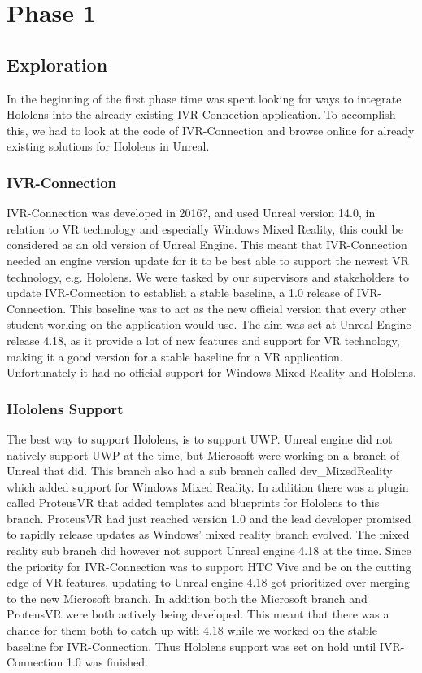 \chapter{Phase 1}
    \label{chapter:phase1}
    \section{Exploration}
    In the beginning of the first phase time was spent looking for ways to integrate Hololens into the already existing IVR-Connection application. To accomplish this, we had to look at the code of IVR-Connection and browse online for already existing solutions for Hololens in Unreal.
    
        \subsection{IVR-Connection}
        IVR-Connection was developed in 2016?, and used Unreal version 14.0, in relation to VR technology and especially Windows Mixed Reality, this could be considered as an old version of Unreal Engine. This meant that IVR-Connection needed an engine version update for it to be best able to support the newest VR technology, e.g. Hololens. We were tasked by our supervisors and stakeholders to update IVR-Connection to establish a stable baseline, a 1.0 release of IVR-Connection. This baseline was to act as the new official version that every other student working on the application would use. The aim was set at Unreal Engine release 4.18, as it provide a lot of new features and support for VR technology, making it a good version for a stable baseline for a VR application. Unfortunately it had no official support for Windows Mixed Reality and Hololens.
        
        
        \subsection{Hololens Support}
        The best way to support Hololens, is to support UWP. Unreal engine did not natively support UWP at the time, but Microsoft were working on a branch of Unreal that did. This branch also had a sub branch called dev\_MixedReality which added support for Windows Mixed Reality. In addition there was a plugin called ProteusVR that added templates and blueprints for Hololens to this branch. ProteusVR had just reached version 1.0 and the lead developer promised to rapidly release updates as Windows' mixed reality branch evolved. The mixed reality sub branch did however not support Unreal engine 4.18 at the time. Since the priority for IVR-Connection was to support HTC Vive and be on the cutting edge of VR features, updating to Unreal engine 4.18 got prioritized over merging to the new Microsoft branch. In addition both the Microsoft branch and ProteusVR were both actively being developed. This meant that there was a chance for them both to catch up with 4.18 while we worked on the stable baseline for IVR-Connection. Thus Hololens support was set on hold until IVR-Connection 1.0 was finished.
        
